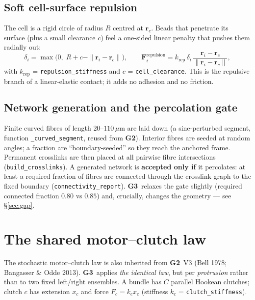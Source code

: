 \documentclass[11pt]{article}
\newcommand{\rv}{\mathbf{r}}
\newcommand{\Fv}{\mathbf{F}}
\newcommand{\umt}{\mu\text{m}}            %
\newcommand{\um}{\,\umt}
\newcommand{\GTwo}{\textcolor{g2col}{\textbf{G2}}}
\newcommand{\GThree}{\textcolor{g3col}{\textbf{G3}}}
\newcommand{\code}[1]{\texttt{\small #1}}
\begin{document}
\subsection{Soft cell-surface repulsion}

The cell is a rigid circle of radius $R$ centred at $\rv_c$. Beads that penetrate its surface
(plus a small clearance $c$) feel a one-sided linear penalty that pushes them radially out:
\begin{equation}
  \delta_i = \max\!\bigl(0,\; R + c - \|\rv_i-\rv_c\|\bigr),
  \qquad
  \Fv_i^{\text{repulsion}} = k_{\text{rep}}\,\delta_i\,
  \frac{\rv_i-\rv_c}{\|\rv_i-\rv_c\|},
  \label{eq:repulsion}
\end{equation}
with $k_{\text{rep}}$ = \code{repulsion\_stiffness} and $c$ = \code{cell\_clearance}. This is the
repulsive branch of a linear-elastic contact; it adds no adhesion and no friction.

\subsection{Network generation and the percolation gate}
\label{sec:gen}

Finite curved fibres of length $20$--$110\um$ are laid down (a sine-perturbed segment, function
\code{\_curved\_segment}, reused from \GTwo). Interior fibres are seeded at random angles; a fraction
are ``boundary-seeded'' so they reach the anchored frame. Permanent crosslinks are then placed at
all pairwise fibre intersections (\code{build\_crosslinks}). A generated network is \textbf{accepted
only if} it percolates: at least a required fraction of fibres are connected through the crosslink
graph to the fixed boundary (\code{connectivity\_report}). \GThree\ relaxes the gate slightly
(required connected fraction $0.80$ vs $0.85$) and, crucially, changes the geometry --- see
\S\ref{sec:gap}.

\section{The shared motor--clutch law}
\label{sec:clutch}

The stochastic motor--clutch law is also inherited from \GTwo\ V3 (Bell 1978; Bangasser \& Odde
2013). \GThree\ applies \emph{the identical law}, but per \emph{protrusion} rather than to two fixed
left/right ensembles. A bundle has $C$ parallel Hookean clutches; clutch $c$ has extension
$x_c$ and force $F_c=k_c x_c$ (stiffness $k_c$ = \code{clutch\_stiffness}).
\end{document}
